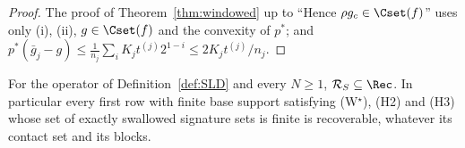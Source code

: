 \begin{proof}
The proof of Theorem~\ref{thm:windowed} up to ``Hence $\rho g_c\in
\Cset(f)$'' uses only (i), (ii), $g\in\Cset(f)$ and the convexity of
$p^*$; and $p^*(\bar g_j-g)\le\frac1{n_j}\sum_iK_jt^{(j)}2^{1-i}\le
2K_jt^{(j)}/n_j$.
\end{proof}

\begin{theorem}\label{thm:S}
For the operator of Definition~\ref{def:SLD} and every $N\ge1$,
$\mathcal R_S\subseteq\Rec$.  In particular every first row with finite
base support satisfying \textup{(W$^\star$)}, \textup{(H2)} and
\textup{(H3)} whose set of exactly swallowed signature sets is finite is
recoverable, whatever its contact set and its blocks.
\end{theorem}

